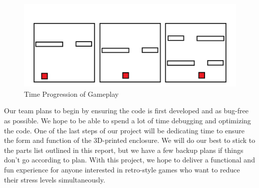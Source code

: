 \documentclass[12pt]{article}
\begin{document}
\begin{figure}[!t]
\centering
\includegraphics[width=4.5in]{display.png}
\caption{Time Progression of Gameplay}
\label{fig:disp}
\end{figure}
Our team plans to begin by ensuring the code is first developed and as bug-free as possible. We hope to be able to spend a lot of time debugging and optimizing the code. One of the last steps of our project will be dedicating time to ensure the form and function of the 3D-printed enclosure. We will do our best to stick to the parts list outlined in this report, but we have a few backup plans if things don't go according to plan. With this project, we hope to deliver a functional and fun experience for anyone interested in retro-style games who want to reduce their stress levels simultaneously.


\newpage
\printbibliography[heading=subbibintoc]
%
%
\end{document}
